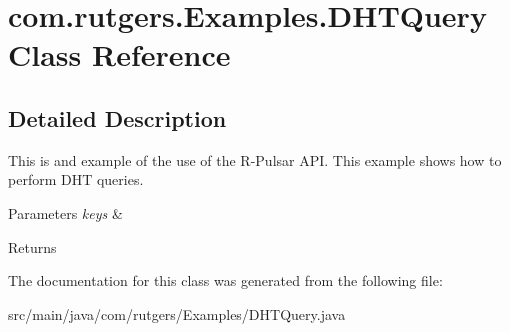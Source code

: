 \hypertarget{classcom_1_1rutgers_1_1Examples_1_1DHTQuery}{}\section{com.\+rutgers.\+Examples.\+D\+H\+T\+Query Class Reference}
\label{classcom_1_1rutgers_1_1Examples_1_1DHTQuery}


\subsection{Detailed Description}
This is and example of the use of the R-\/\+Pulsar A\+PI. This example shows how to perform D\+HT queries. 
\begin{DoxyParams}{Parameters}
{\em keys} & \\
\hline
\end{DoxyParams}
\begin{DoxyReturn}{Returns}

\end{DoxyReturn}


The documentation for this class was generated from the following file\+:\begin{DoxyCompactItemize}
\item 
src/main/java/com/rutgers/\+Examples/D\+H\+T\+Query.\+java\end{DoxyCompactItemize}
